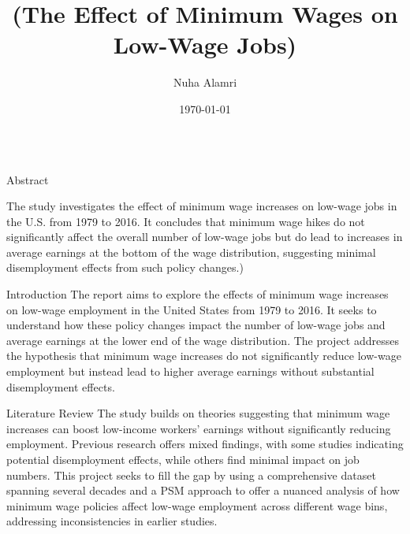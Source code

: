 \documentclass[final]{beamer}
\title{\Huge  (The Effect of Minimum Wages on Low-Wage Jobs)} %
\author{\Large Nuha Alamri} %
\institute{\Large Texas A\&M University} %
\date{\Large\today} %
\begin{document}
\begin{frame}[t]

\begin{block}{}
\centering
\maketitle
\end{block}

\begin{columns}[T] %

\begin{column}{.32\textwidth}
    \begin{block}{\Huge Abstract} %


    \Large %
    The study investigates the effect of minimum wage increases on low-wage jobs in the U.S. from 1979 to 2016. It concludes that minimum wage hikes do not significantly affect the overall number of low-wage jobs but do lead to increases in average earnings at the bottom of the wage distribution, suggesting minimal disemployment effects from such policy changes.)
    \end{block}

    \vspace{1cm} %

    \begin{block}{\Huge Introduction} %
    \Large %
    The report aims to explore the effects of minimum wage increases on low-wage employment in the United States from 1979 to 2016. It seeks to understand how these policy changes impact the number of low-wage jobs and average earnings at the lower end of the wage distribution. The project addresses the hypothesis that minimum wage increases do not significantly reduce low-wage employment but instead lead to higher average earnings without substantial disemployment effects.
    
    \end{block}

    \vspace{1cm} %

    \begin{block}{\Huge Literature Review} %
    \Large %
    The study builds on theories suggesting that minimum wage increases can boost low-income workers' earnings without significantly reducing employment. Previous research offers mixed findings, with some studies indicating potential disemployment effects, while others find minimal impact on job numbers. This project seeks to fill the gap by using a comprehensive dataset spanning several decades and a PSM approach to offer a nuanced analysis of how minimum wage policies affect low-wage employment across different wage bins, addressing inconsistencies in earlier studies.
   

\end{block}
\end{column}
\end{columns}
\end{frame}
\end{document}
